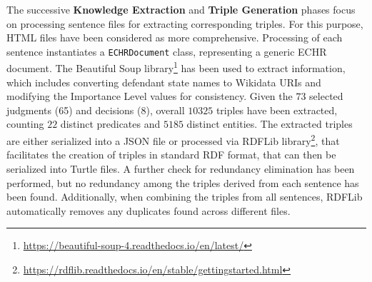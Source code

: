 \documentclass[runningheads]{llncs}
\begin{document}
The successive \textbf{Knowledge Extraction} and \textbf{Triple Generation} phases focus on processing sentence files %
for extracting corresponding triples. %
For this purpose, HTML files have been considered as more comprehensive. Processing of each sentence instantiates a \texttt{ECHRDocument} class, representing a generic ECHR document. 
The Beautiful Soup library\footnote{\url{https://beautiful-soup-4.readthedocs.io/en/latest/}} has been used to extract information, which includes converting defendant state names to Wikidata URIs and modifying the Importance Level values for consistency.
Given the $73$ selected judgments (65) and decisions (8), overall $10325$ triples have been extracted, counting $22$ distinct predicates and $5185$ distinct entities. %
%
The extracted triples are either serialized into a JSON file or %
processed via RDFLib library\footnote{\url{https://rdflib.readthedocs.io/en/stable/gettingstarted.html}}, %
that facilitates the creation of triples in standard RDF format, that can then be serialized into Turtle files. A further check for redundancy elimination has been performed, but no redundancy among the triples derived from each sentence has been found. Additionally, when combining the triples from all sentences, %
RDFLib automatically removes any duplicates found across different files.
\end{document}
